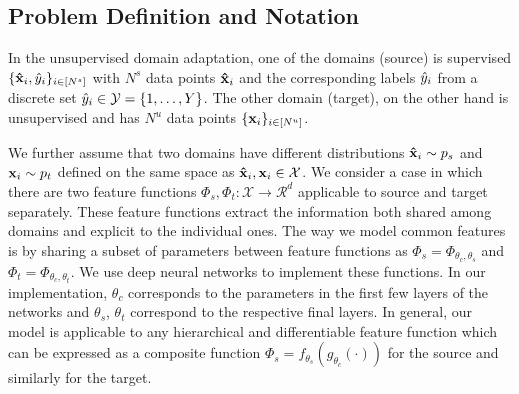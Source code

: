 
\subsection{Problem Definition and Notation}
\label{prob:def}
In the unsupervised domain adaptation, one of the domains (source) is supervised $\{\mathbf{\hat{x}}_i, \hat{y}_i \}_{i \in [N^s]}$ with $N^s$ data points $\mathbf{\hat{x}}_i$ and the corresponding labels $\hat{y}_i$ from a discrete set $\hat{y}_i \in \mathcal{Y} = \{1,\ldots, Y \}$.  The other domain (target), on the other hand is unsupervised and has $N^u$ data points $\{\mathbf{x}_i \}_{i \in [N^u]}$. 

We further assume that two domains have different distributions $\mathbf{\hat{x}}_i \sim p_s$ and $\mathbf{x}_i \sim p_t$ defined on the same space as $\mathbf{\hat{x}}_i,\mathbf{x}_i \in \mathcal{X}$. We consider a case in which there are two feature functions  \mbox{$\Phi_s, \Phi_t:\mathcal{X}\rightarrow \mathcal{R}^d$} applicable to source and target separately. These feature functions extract the information both shared among domains and explicit to the individual ones. The way we model common features is by sharing a subset of parameters between feature functions as \mbox{$\Phi_s=\Phi_{\theta_c,\theta_s}$} and \mbox{$\Phi_t=\Phi_{\theta_c,\theta_t}$}. We use deep neural networks to implement these functions. In our implementation, $\theta_c$ corresponds to the parameters in the first few layers of the networks and $\theta_s$, $\theta_t$ correspond to the respective final layers. In general, our model is applicable to any hierarchical and differentiable feature function which can be expressed as a composite function $\Phi_s = f_{\theta_s}(g_{\theta_c}(\cdot))$ for the source and similarly for the target.

